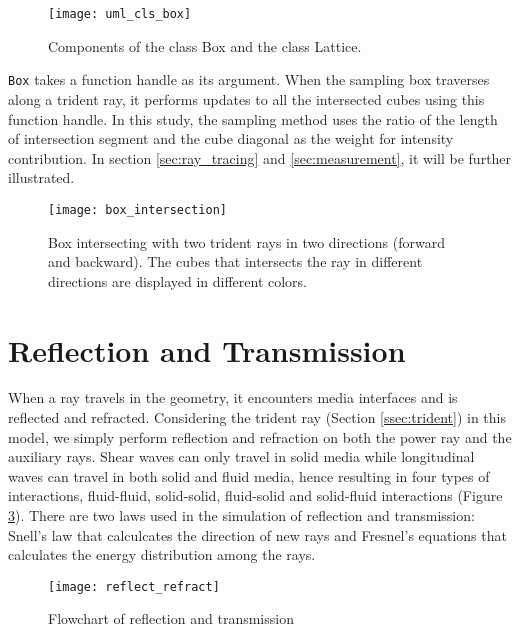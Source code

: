 \begin{figure}[h]
    \centering
    \texttt{[image: uml\_cls\_box]}
    \caption{Components of the class Box and the class Lattice.}
    \label{fig:uml_cls_box}
\end{figure}

\texttt{Box} takes a function handle as its argument. When the sampling box traverses along a trident ray,  it performs updates to all the intersected cubes using this function handle. In this study, the sampling method uses the ratio of the length of intersection segment and the cube diagonal as the weight for intensity contribution. In section \ref{sec:ray_tracing} and \ref{sec:measurement}, it will be further illustrated. 

\begin{figure}[h]
    \centering
    \texttt{[image: box\_intersection]}
    \caption{Box intersecting with two trident rays in two directions (forward and backward). The cubes that intersects the ray in different directions are displayed in different colors.}
    \label{fig:box_intersection}
\end{figure}

\section{Reflection and Transmission} \label{sec:rnr}

When a ray travels in the geometry, it encounters media interfaces and is reflected and refracted. Considering the trident ray (Section \ref{ssec:trident}) in this model, we simply perform reflection and refraction on both the power ray and the auxiliary rays. Shear waves can only travel in solid media while longitudinal waves can travel in both solid and fluid media, hence resulting in four types of interactions, fluid-fluid, solid-solid, fluid-solid and solid-fluid interactions (Figure \ref{fig:reflect_refract}). 
There are two laws used in the simulation of reflection and transmission: Snell's law that calculcates the direction of new rays and Fresnel's equations that calculates the energy distribution among the rays.

\begin{figure}[h]
    \centering
    \texttt{[image: reflect\_refract]}
    \caption{Flowchart of reflection and transmission}
    \label{fig:reflect_refract}
\end{figure}

